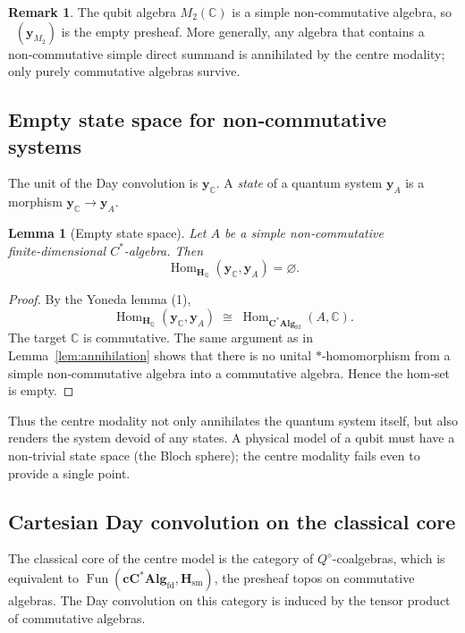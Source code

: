 \documentclass[12pt,a4paper]{article}
\theoremstyle{plain}
\newtheorem{lemma}[theorem]{Lemma}
\theoremstyle{definition}
\newtheorem{remark}[theorem]{Remark}
\DeclareMathOperator{\Qpot}{Q^{\diamond}}
\DeclareMathOperator{\Fun}{Fun}
\DeclareMathOperator{\Hom}{Hom}
\newcommand{\Htopos}{\mathbf{H}_{\mathbb{Q}}}
\newcommand{\CAlgfd}{\mathbf{C}^{*}\mathbf{Alg}_{\mathrm{fd}}}
\newcommand{\cCAlg}{\mathbf{cC^{*}Alg}_{\mathrm{fd}}}
\begin{document}
\begin{remark}
The qubit algebra \(M_2(\mathbb{C})\) is a simple non‑commutative algebra, so \(\Qpot(\mathbf{y}_{M_2})\) is the empty presheaf.  More generally, any algebra that contains a non‑commutative simple direct summand is annihilated by the centre modality; only purely commutative algebras survive.
\end{remark}

\subsection{Empty state space for non‑commutative systems}
\label{sec:states}

The unit of the Day convolution is \(\mathbf{y}_{\mathbb{C}}\).  A \emph{state} of a quantum system \(\mathbf{y}_A\) is a morphism \(\mathbf{y}_{\mathbb{C}} \to \mathbf{y}_A\).

\begin{lemma}[Empty state space]\label{lem:empty-states}
Let \(A\) be a simple non‑commutative finite‑dimensional \(C^{*}\)-algebra.  Then
\[
\Hom_{\Htopos}(\mathbf{y}_{\mathbb{C}}, \mathbf{y}_A) = \varnothing .
\]
\end{lemma}

\begin{proof}
By the Yoneda lemma (1),
\[
\Hom_{\Htopos}(\mathbf{y}_{\mathbb{C}}, \mathbf{y}_A) \;\cong\; \Hom_{\CAlgfd}(A, \mathbb{C}).
\]
The target \(\mathbb{C}\) is commutative.  The same argument as in Lemma~\ref{lem:annihilation} shows that there is no unital \(*\)-homomorphism from a simple non‑commutative algebra into a commutative algebra.  Hence the hom‑set is empty. \qedhere
\end{proof}

Thus the centre modality not only annihilates the quantum system itself, but also renders the system devoid of any states.  A physical model of a qubit must have a non‑trivial state space (the Bloch sphere); the centre modality fails even to provide a single point.

\subsection{Cartesian Day convolution on the classical core}
\label{sec:seely}

The classical core of the centre model is the category of \(Q^{\diamond}\)-coalgebras, which is equivalent to \(\Fun(\cCAlg,\mathbf{H}_{\mathrm{sm}})\), the presheaf topos on commutative algebras.  The Day convolution on this category is induced by the tensor product of commutative algebras.
\end{document}
